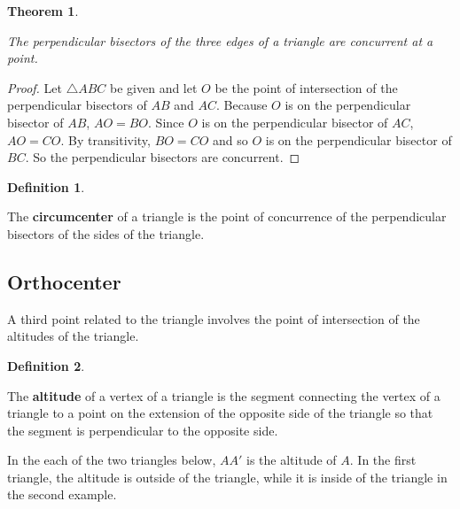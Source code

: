 \documentclass[
]{book}
\newtheorem{theorem}{Theorem}[chapter]
\theoremstyle{definition}
\newtheorem{definition}{Definition}[chapter]
\theoremstyle{definition}
\theoremstyle{definition}
\theoremstyle{definition}
\theoremstyle{remark}
\begin{document}
\begin{theorem}
\protect\hypertarget{thm:unlabeled-div-189}{}\label{thm:unlabeled-div-189}

The perpendicular bisectors of the three edges of a triangle are concurrent at a point.

\end{theorem}

\begin{proof}

Let \(\triangle ABC\) be given and let \(O\) be the point of intersection of the perpendicular bisectors of \(AB\) and \(AC\). Because \(O\) is on the perpendicular bisector of \(AB\), \(AO=BO\). Since \(O\) is on the perpendicular bisector of \(AC\), \(AO=CO\). By transitivity, \(BO=CO\) and so \(O\) is on the perpendicular bisector of \(BC\). So the perpendicular bisectors are concurrent.

\end{proof}

\begin{definition}
\protect\hypertarget{def:unlabeled-div-191}{}\label{def:unlabeled-div-191}

The \textbf{circumcenter} of a triangle is the point of concurrence of the perpendicular bisectors of the sides of the triangle.

\end{definition}

\hypertarget{orthocenter}{%
\subsection{Orthocenter}\label{orthocenter}}

A third point related to the triangle involves the point of intersection of the altitudes of the triangle.

\begin{definition}
\protect\hypertarget{def:unlabeled-div-192}{}\label{def:unlabeled-div-192}

The \textbf{altitude} of a vertex of a triangle is the segment connecting the vertex of a triangle to a point on the extension of the opposite side of the triangle so that the segment is perpendicular to the opposite side.

\end{definition}

In the each of the two triangles below, \(AA'\) is the altitude of \(A\). In the first triangle, the altitude is outside of the triangle, while it is inside of the triangle in the second example.
\end{document}
